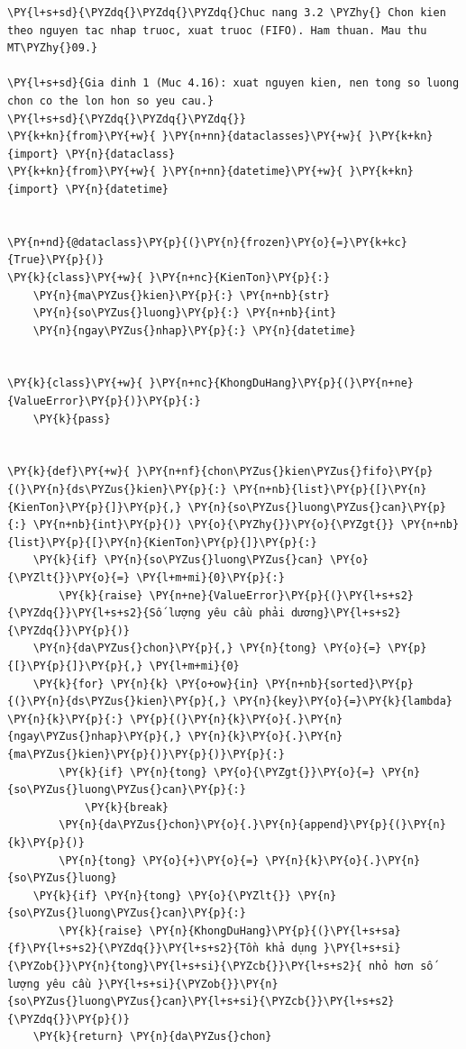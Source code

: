 \begin{Verbatim}[commandchars=\\\{\},frame=single,framerule=0.3pt,rulecolor=\color{black!40},fontsize=\footnotesize,breaklines=true]
\PY{l+s+sd}{\PYZdq{}\PYZdq{}\PYZdq{}Chuc nang 3.2 \PYZhy{} Chon kien theo nguyen tac nhap truoc, xuat truoc (FIFO). Ham thuan. Mau thu MT\PYZhy{}09.}

\PY{l+s+sd}{Gia dinh 1 (Muc 4.16): xuat nguyen kien, nen tong so luong chon co the lon hon so yeu cau.}
\PY{l+s+sd}{\PYZdq{}\PYZdq{}\PYZdq{}}
\PY{k+kn}{from}\PY{+w}{ }\PY{n+nn}{dataclasses}\PY{+w}{ }\PY{k+kn}{import} \PY{n}{dataclass}
\PY{k+kn}{from}\PY{+w}{ }\PY{n+nn}{datetime}\PY{+w}{ }\PY{k+kn}{import} \PY{n}{datetime}


\PY{n+nd}{@dataclass}\PY{p}{(}\PY{n}{frozen}\PY{o}{=}\PY{k+kc}{True}\PY{p}{)}
\PY{k}{class}\PY{+w}{ }\PY{n+nc}{KienTon}\PY{p}{:}
    \PY{n}{ma\PYZus{}kien}\PY{p}{:} \PY{n+nb}{str}
    \PY{n}{so\PYZus{}luong}\PY{p}{:} \PY{n+nb}{int}
    \PY{n}{ngay\PYZus{}nhap}\PY{p}{:} \PY{n}{datetime}


\PY{k}{class}\PY{+w}{ }\PY{n+nc}{KhongDuHang}\PY{p}{(}\PY{n+ne}{ValueError}\PY{p}{)}\PY{p}{:}
    \PY{k}{pass}


\PY{k}{def}\PY{+w}{ }\PY{n+nf}{chon\PYZus{}kien\PYZus{}fifo}\PY{p}{(}\PY{n}{ds\PYZus{}kien}\PY{p}{:} \PY{n+nb}{list}\PY{p}{[}\PY{n}{KienTon}\PY{p}{]}\PY{p}{,} \PY{n}{so\PYZus{}luong\PYZus{}can}\PY{p}{:} \PY{n+nb}{int}\PY{p}{)} \PY{o}{\PYZhy{}}\PY{o}{\PYZgt{}} \PY{n+nb}{list}\PY{p}{[}\PY{n}{KienTon}\PY{p}{]}\PY{p}{:}
    \PY{k}{if} \PY{n}{so\PYZus{}luong\PYZus{}can} \PY{o}{\PYZlt{}}\PY{o}{=} \PY{l+m+mi}{0}\PY{p}{:}
        \PY{k}{raise} \PY{n+ne}{ValueError}\PY{p}{(}\PY{l+s+s2}{\PYZdq{}}\PY{l+s+s2}{Số lượng yêu cầu phải dương}\PY{l+s+s2}{\PYZdq{}}\PY{p}{)}
    \PY{n}{da\PYZus{}chon}\PY{p}{,} \PY{n}{tong} \PY{o}{=} \PY{p}{[}\PY{p}{]}\PY{p}{,} \PY{l+m+mi}{0}
    \PY{k}{for} \PY{n}{k} \PY{o+ow}{in} \PY{n+nb}{sorted}\PY{p}{(}\PY{n}{ds\PYZus{}kien}\PY{p}{,} \PY{n}{key}\PY{o}{=}\PY{k}{lambda} \PY{n}{k}\PY{p}{:} \PY{p}{(}\PY{n}{k}\PY{o}{.}\PY{n}{ngay\PYZus{}nhap}\PY{p}{,} \PY{n}{k}\PY{o}{.}\PY{n}{ma\PYZus{}kien}\PY{p}{)}\PY{p}{)}\PY{p}{:}
        \PY{k}{if} \PY{n}{tong} \PY{o}{\PYZgt{}}\PY{o}{=} \PY{n}{so\PYZus{}luong\PYZus{}can}\PY{p}{:}
            \PY{k}{break}
        \PY{n}{da\PYZus{}chon}\PY{o}{.}\PY{n}{append}\PY{p}{(}\PY{n}{k}\PY{p}{)}
        \PY{n}{tong} \PY{o}{+}\PY{o}{=} \PY{n}{k}\PY{o}{.}\PY{n}{so\PYZus{}luong}
    \PY{k}{if} \PY{n}{tong} \PY{o}{\PYZlt{}} \PY{n}{so\PYZus{}luong\PYZus{}can}\PY{p}{:}
        \PY{k}{raise} \PY{n}{KhongDuHang}\PY{p}{(}\PY{l+s+sa}{f}\PY{l+s+s2}{\PYZdq{}}\PY{l+s+s2}{Tồn khả dụng }\PY{l+s+si}{\PYZob{}}\PY{n}{tong}\PY{l+s+si}{\PYZcb{}}\PY{l+s+s2}{ nhỏ hơn số lượng yêu cầu }\PY{l+s+si}{\PYZob{}}\PY{n}{so\PYZus{}luong\PYZus{}can}\PY{l+s+si}{\PYZcb{}}\PY{l+s+s2}{\PYZdq{}}\PY{p}{)}
    \PY{k}{return} \PY{n}{da\PYZus{}chon}
\end{Verbatim}
